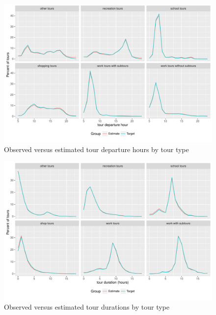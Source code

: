\begin{figure}  %
\centering
\includegraphics[scale=0.9]{pt/pt-tour-departure-hours-redux}
\caption{Observed versus estimated tour departure hours by tour type}
\label{fig:pt-tour-departure-times-redux}
\end{figure}

\begin{figure}  %
\centering
\includegraphics[scale=0.9]{pt/pt-tour-durations-redux}
\caption{Observed versus estimated tour durations by tour type}
\label{fig:pt-tour-durations-redux}
\end{figure}

